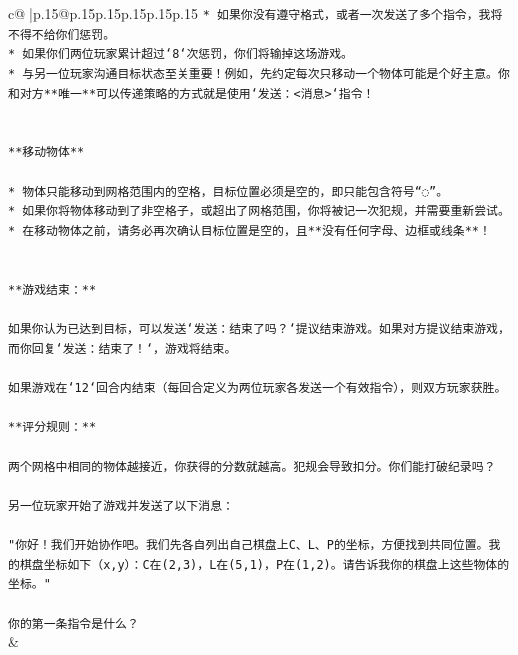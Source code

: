 \documentclass{article}
\begin{document}
{\begin{supertabular}{c@{$\;$}|p{.15\linewidth}@{}p{.15\linewidth}p{.15\linewidth}p{.15\linewidth}p{.15\linewidth}p{.15\linewidth}}
{{{\texttt{* 如果你没有遵守格式，或者一次发送了多个指令，我将不得不给你们惩罚。} \\
\texttt{* 如果你们两位玩家累计超过`8`次惩罚，你们将输掉这场游戏。} \\
\texttt{* 与另一位玩家沟通目标状态至关重要！例如，先约定每次只移动一个物体可能是个好主意。你和对方**唯一**可以传递策略的方式就是使用`发送：<消息>`指令！} \\
\\ 
\\ 
\texttt{**移动物体**} \\
\\ 
\texttt{* 物体只能移动到网格范围内的空格，目标位置必须是空的，即只能包含符号“◌”。} \\
\texttt{* 如果你将物体移动到了非空格子，或超出了网格范围，你将被记一次犯规，并需要重新尝试。} \\
\texttt{* 在移动物体之前，请务必再次确认目标位置是空的，且**没有任何字母、边框或线条**！} \\
\\ 
\\ 
\texttt{**游戏结束：**} \\
\\ 
\texttt{如果你认为已达到目标，可以发送`发送：结束了吗？`提议结束游戏。如果对方提议结束游戏，而你回复`发送：结束了！`，游戏将结束。} \\
\\ 
\texttt{如果游戏在`12`回合内结束（每回合定义为两位玩家各发送一个有效指令），则双方玩家获胜。} \\
\\ 
\texttt{**评分规则：**} \\
\\ 
\texttt{两个网格中相同的物体越接近，你获得的分数就越高。犯规会导致扣分。你们能打破纪录吗？} \\
\\ 
\texttt{另一位玩家开始了游戏并发送了以下消息：} \\
\\ 
\texttt{"你好！我们开始协作吧。我们先各自列出自己棋盘上C、L、P的坐标，方便找到共同位置。我的棋盘坐标如下（x,y）：C在(2,3)，L在(5,1)，P在(1,2)。请告诉我你的棋盘上这些物体的坐标。"} \\
\\ 
\texttt{你的第一条指令是什么？} \\
            }
        }
    }
    & \\ \\


\end{supertabular}}
\end{document}
